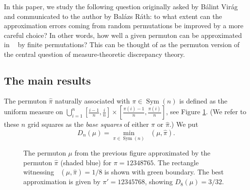 \documentclass{article}
\newcommand{\Sym}{\mathop{\mathrm{Sym}}}
\newcommand{\ds}{\mathop{d_\square}}
\theoremstyle{definition}
\begin{document}
In this paper, we study the following question originally asked by Bálint Virág and communicated to the author by Balázs Ráth: to what extent can the approximation errors coming from random permutations be improved by a more careful choice? In other words, how well a given permuton can be approximated in $\ds$ by finite permutations? This can be thought of as the permuton version of the central question of measure-theoretic discrepancy theory.

\subsection{The main results} \label{sec:main_results}

The permuton $\widehat{\pi}$ naturally associated with $\pi\in\Sym(n)$ is defined as the uniform measure on $\bigcup_{i=1}^{n} \left[\frac{i-1}{n}, \frac{i}{n}\right]\times \left[\frac{\pi(i)-1}{n}, \frac{\pi(i)}{n}\right]$, see Figure \ref{fig:approx_example}. (We refer to these $n$ grid squares as the \emph{base squares} of either $\pi$ or $\widehat{\pi}$.) We put 
$$D_n(\mu)=\min_{\pi \in \Sym(n)} \ds(\mu, \widehat{\pi}).$$
\begin{figure}\centering
{}
\caption{The permuton $\mu$ from the previous figure approximated by the permuton $\widehat{\pi}$ (shaded blue) for $\pi=12348765$. The rectangle witnessing $\ds(\mu, \widehat{\pi})=1/8$ is shown with green boundary. The best approximation is given by $\pi'=12345768$, showing $D_8(\mu)=3/32$.} \label{fig:approx_example}
\end{figure}
\end{document}
